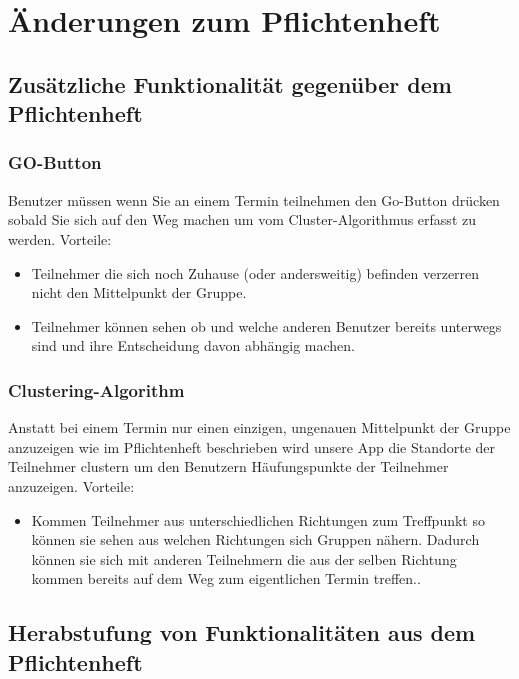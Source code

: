 \section{Änderungen zum Pflichtenheft}
	\subsection{Zusätzliche Funktionalität gegenüber dem Pflichtenheft}
	\subsubsection{GO-Button}
		Benutzer müssen wenn Sie an einem Termin teilnehmen den Go-Button drücken sobald Sie sich auf den Weg machen um vom Cluster-Algorithmus erfasst zu werden. 
		\newline
		Vorteile:
		\begin{itemize}
		\item Teilnehmer die sich noch Zuhause (oder andersweitig) befinden verzerren nicht den Mittelpunkt der Gruppe.
		\item Teilnehmer können sehen ob und welche anderen Benutzer bereits unterwegs sind und ihre Entscheidung davon abhängig machen.
		\end{itemize}
	\subsubsection{Clustering-Algorithm}
	Anstatt bei einem Termin nur einen einzigen, ungenauen Mittelpunkt der Gruppe anzuzeigen wie im Pflichtenheft beschrieben wird unsere App die Standorte der Teilnehmer clustern um den Benutzern Häufungspunkte der Teilnehmer anzuzeigen.
		\newline
		Vorteile:
		\begin{itemize}
		\item Kommen Teilnehmer aus unterschiedlichen Richtungen zum Treffpunkt so können sie sehen aus welchen Richtungen sich Gruppen nähern. Dadurch können sie sich mit anderen Teilnehmern die aus der selben Richtung kommen bereits auf dem Weg zum eigentlichen Termin treffen.. 
		\end{itemize}
	\subsection{Herabstufung von Funktionalitäten aus dem Pflichtenheft}
